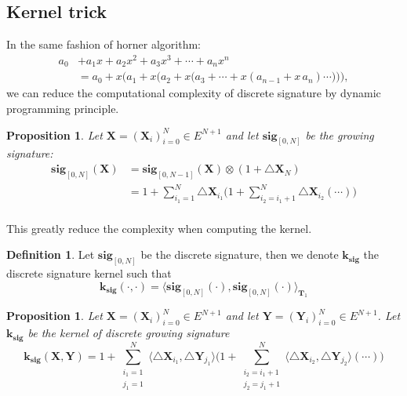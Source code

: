 \documentclass[12pt]{report}
\newtheorem{proposition}[theorem]{Proposition}
\theoremstyle{definition}
\newtheorem{definition}[theorem]{Definition}
\theoremstyle{remark}
\begin{document}
  \subsection{Kernel trick}
  In the same fashion of horner algorithm:
  \begin{equation}
    \begin{aligned}a_{0}&+a_{1}x+a_{2}x^{2}+a_{3}x^{3}+\cdots +a_{n}x^{n}\\&=a_{0}+x{\bigg (}a_{1}+x{\Big (}a_{2}+x{\big (}a_{3}+\cdots +x(a_{n-1}+x\,a_{n})\cdots {\big )}{\Big )}{\bigg )},\end{aligned}
  \end{equation}
  we can reduce the computational complexity of discrete signature by dynamic programming principle.
  \begin{proposition}Let $\mathbf{X} = (\mathbf{X}_{i})_{i=0}^{N} \in E^{N+1}$ and let $\mathbf{sig}_{[0,N]}$ be the growing signature:
  \begin{equation}
    \begin{split}
      \mathbf{sig}_{[0,N]}(\mathbf{X}) &= \mathbf{sig}_{[0,N-1]}(\mathbf{X}) \otimes(1 + \triangle \mathbf{X}_{N})\\
      &= 1 + \sum_{i_{1} = 1}^{N}\triangle \mathbf{X}_{i_{1}}\Big(1 + \sum_{i_{2} = i_{1}+1}^{N}\triangle\mathbf{X}_{i_{2}}(\cdots)\Big)\\
    \end{split}
  \end{equation}
  \end{proposition}
  This greatly reduce the complexity when computing the kernel. 
  \begin{definition} Let $\mathbf{sig}_{[0,N]}$ be the discrete signature, then we denote $\mathbf{k}_{\mathbf{sig}}$ the discrete signature kernel such that 
  \begin{equation}
    \mathbf{k}_{\mathbf{sig}}(\cdot,\cdot) = \langle \mathbf{sig}_{[0,N]}(\cdot),\mathbf{sig}_{[0,N]}(\cdot)\rangle_{\mathbf{T}_{1}}
  \end{equation}
  \end{definition}
  \begin{proposition}\label{recur1}
    Let $\mathbf{X} = (\mathbf{X}_{i})_{i=0}^{N} \in E^{N+1}$ and let $\mathbf{Y} = (\mathbf{Y}_{i})_{i=0}^{N} \in E^{N+1}$. Let $\mathbf{k}_{\mathbf{sig}}$ be the kernel of discrete growing signature
  \begin{equation}\label{kernel}
    \mathbf{k}_{\mathbf{sig}}(\mathbf{X},\mathbf{Y}) = 1 + \sum_{\substack{i_{1}=1 \\ j_{1} = 1}}^{N}\langle \triangle \mathbf{X}_{i_{1}},  \triangle \mathbf{Y}_{j_{1}} \rangle\Big(1 + \sum_{\substack{i_{2}=i_{1}+1 \\ j_{2} = j_{1}+1}}^{N}\langle \triangle \mathbf{X}_{i_{2}},  \triangle \mathbf{Y}_{j_{2}} \rangle(\cdots)\Big)
  \end{equation}
  \end{proposition}  
\end{document}
